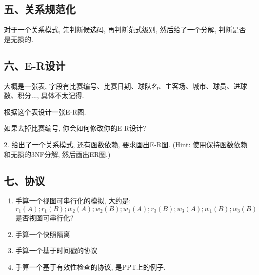 \subsection{五、关系规范化}

对于一个关系模式, 先判断候选码, 再判断范式级别, 然后给了一个分解, 判断是否是无损的.

\subsection{六、E-R设计}

大概是一张表, 字段有比赛编号、比赛日期、球队名、主客场、城市、球员、进球数、积分..., 具体不太记得.

根据这个表设计一张E-R图.

如果去掉比赛编号, 你会如何修改你的E-R设计?

2. 给出了一个关系模式, 还有函数依赖, 要求画出E-R图. (Hint: 使用保持函数依赖和无损的3NF分解, 然后画出ER图.)

\subsection{七、协议}

\begin{enumerate}
    \item 手算一个视图可串行化的模拟, 大约是: $r_1(A);r_1(B);w_2(A);w_2(B);w_1(A);r_3(B);w_3(A);w_1(B);w_3(B)$是否视图可串行化?
    \item 手算一个快照隔离
    \item 手算一个基于时间戳的协议
    \item 手算一个基于有效性检查的协议, 是PPT上的例子.
\end{enumerate}
